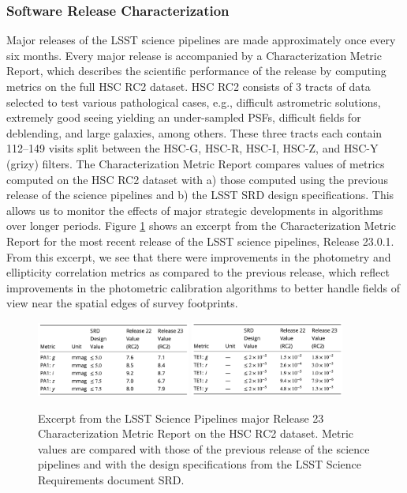 \subsubsection{Software Release Characterization } \label{sssec:characterization}

Major releases of the LSST science pipelines are made approximately once every six months. 
Every major release is accompanied by a Characterization Metric Report, which describes the scientific performance of the release by computing \faro metrics on the full HSC RC2 dataset. 
HSC RC2 consists of 3 tracts of data selected to test various pathological cases, e.g., difficult astrometric solutions, extremely good seeing yielding an under-sampled PSFs, difficult fields for deblending, and large galaxies, among others.
These three tracts each contain 112--149 visits split between the HSC-G, HSC-R, HSC-I, HSC-Z, and HSC-Y (grizy) filters.
The Characterization Metric Report compares values of metrics computed on the HSC RC2 dataset with a) those computed using the previous release of the science pipelines and b) the LSST SRD design specifications. 
This allows us to monitor the effects of major strategic developments in algorithms over longer periods.
Figure \ref{fig:cmr_r23} shows an excerpt from the Characterization Metric Report \cite{dmtr-351} for the most recent release of the LSST science pipelines, Release 23.0.1.
From this excerpt, we see that there were improvements in the photometry and ellipticity correlation metrics as compared to the previous release, which reflect improvements in the photometric calibration algorithms to better handle fields of view near the spatial edges of survey footprints. 
\begin{figure}[!ht]
  \centering
  \includegraphics[width=0.45\textwidth]{figures/cmr_r23_photometric_metrics} 
  \hspace{0.5cm}
  \includegraphics[width=0.45\textwidth]{figures/cmr_r23_ellipticity_metrics}
  \par\medskip %
  \caption{Excerpt from the  LSST Science Pipelines major Release 23 Characterization Metric Report on the HSC RC2 dataset. Metric values are compared with those of the previous release of the science pipelines and with the design specifications from the LSST Science Requirements document SRD.}
  \label{fig:cmr_r23}
\end{figure}

